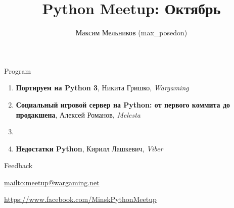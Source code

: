 \documentclass[aspectratio=169]{beamer}
\begin{document}
\title{Python Meetup: Октябрь}
\author{Максим Мельников (max\_posedon)}
\date{}

\begin{frame}{\inserttitle}
    \begin{block}{Program}
    \begin{enumerate}
        \item \textbf{Портируем на Python 3}, Никита Гришко, \textit{Wargaming}
        \item \textbf{Социальный игровой сервер на Python: от первого коммита до продакшена}, Алексей Романов, \textit{Melesta}
        \item
        \item \textbf{Недостатки Python}, Кирилл Лашкевич, \textit{Viber} 
        \end{enumerate}
    \end{block}

    \begin{block}{Feedback}
    \par \url{mailto:meetup@wargaming.net}
    \par \url{https://www.facebook.com/MinskPythonMeetup}
    \end{block}
\end{frame}
\end{document}
